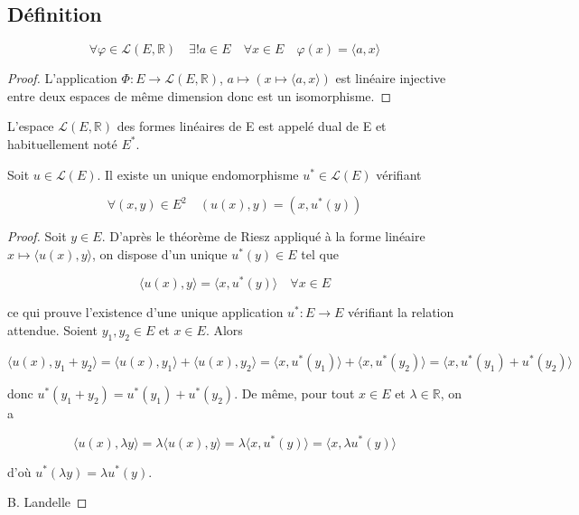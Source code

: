 \subsection{Définition}

\begin{theorem}
\label{thm:theoreme-de-representation-de-riesz}


\[ \forall \varphi \in \mathcal{L}(E, \mathbb{R}) \quad \exists ! a \in E \quad \forall x \in E \quad \varphi(x) = \langle a, x \rangle \]

\end{theorem}

\begin{proof}

L'application $\Phi : E \to \mathcal{L}(E, \mathbb{R})$, $a \mapsto (x \mapsto \langle a, x \rangle)$ est linéaire injective entre deux espaces de même dimension donc est un isomorphisme.

\end{proof}

\begin{remark}

L'espace $\mathcal{L}(E, \mathbb{R})$ des formes linéaires de E est appelé dual de E et habituellement noté $E^*$.

\end{remark}

\begin{theorem}
\label{thm:1}

Soit $u \in \mathcal{L}(E)$. Il existe un unique endomorphisme $u^* \in \mathcal{L}(E)$ vérifiant

\[ \forall (x, y) \in E^2 \quad (u(x), y) = (x, u^*(y)) \]

\end{theorem}

\begin{proof}

Soit $y \in E$. D'après le théorème de Riesz appliqué à la forme linéaire $x \mapsto \langle u(x), y \rangle$, on dispose d'un unique $u^*(y) \in E$ tel que

\[ \langle u(x), y \rangle = \langle x, u^*(y) \rangle \quad \forall x \in E \]

ce qui prouve l'existence d'une unique application $u^* : E \to E$ vérifiant la relation attendue.
Soient $y_1, y_2 \in E$ et $x \in E$. Alors

\[ \langle u(x), y_1 + y_2 \rangle = \langle u(x), y_1 \rangle + \langle u(x), y_2 \rangle = \langle x, u^*(y_1) \rangle + \langle x, u^*(y_2) \rangle = \langle x, u^*(y_1) + u^*(y_2) \rangle \]

donc $u^*(y_1 + y_2) = u^*(y_1) + u^*(y_2)$. De même, pour tout $x \in E$ et $\lambda \in \mathbb{R}$, on a

\[ \langle u(x), \lambda y \rangle = \lambda \langle u(x), y \rangle = \lambda \langle x, u^*(y) \rangle = \langle x, \lambda u^*(y) \rangle \]

d'où $u^*(\lambda y) = \lambda u^*(y)$.

B. Landelle

\end{proof}

